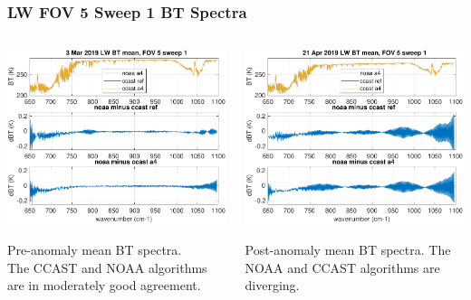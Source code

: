 \documentclass[10pt]{beamer}
\begin{document}
\begin{frame}
\frametitle{LW FOV 5 Sweep 1 BT Spectra}
\begin{columns}[t]
\begin{column}{0.5\textwidth}
  \begin{centering}
  \includegraphics[width=\textwidth]{figures/LW_MW_good_BT_fov5_sd1.pdf}
  \end{centering}\vspace{3mm}
  Pre-anomaly mean BT spectra.  \\The CCAST and NOAA algorithms are
  in moderately good agreement.

\end{column}
\begin{column}{0.5\textwidth}  
  \begin{centering}
  \includegraphics[width=\textwidth]{figures/LW_MW_fail_BT_fov5_sd1.pdf}
  \end{centering}\vspace{3mm}
  Post-anomaly mean BT spectra.  The NOAA and CCAST algorithms are
  diverging.

\end{column}
\end{columns}
\end{frame}
\end{document}
